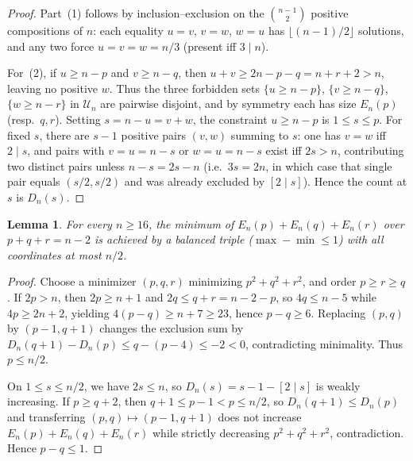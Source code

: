 \documentclass[11pt]{article}
\newtheorem{lemma}[theorem]{Lemma}
\begin{document}
\begin{proof}
Part~(1) follows by inclusion--exclusion on the $\binom{n-1}{2}$ positive compositions of $n$: each equality $u = v$, $v = w$, $w = u$ has $\lfloor (n-1)/2 \rfloor$ solutions, and any two force $u = v = w = n/3$ (present iff $3 \mid n$).

For~(2), if $u \ge n - p$ and $v \ge n - q$, then $u + v \ge 2n - p - q = n + r + 2 > n$, leaving no positive $w$. Thus the three forbidden sets $\{u \ge n - p\}$, $\{v \ge n - q\}$, $\{w \ge n - r\}$ in $\mathcal{U}_n$ are pairwise disjoint, and by symmetry each has size $E_n(p)$ (resp.\ $q, r$). Setting $s = n - u = v + w$, the constraint $u \ge n - p$ is $1 \le s \le p$. For fixed $s$, there are $s - 1$ positive pairs $(v, w)$ summing to $s$: one has $v = w$ iff $2 \mid s$, and pairs with $v = u = n - s$ or $w = u = n - s$ exist iff $2s > n$, contributing two distinct pairs unless $n - s = 2s - n$ (i.e.\ $3s = 2n$, in which case that single pair equals $(s/2, s/2)$ and was already excluded by $[2 \mid s]$). Hence the count at $s$ is $D_n(s)$.
\end{proof}

\begin{lemma}\label{lem:balance}
For every $n \ge 16$, the minimum of $E_n(p) + E_n(q) + E_n(r)$ over $p + q + r = n - 2$ is achieved by a balanced triple ($\max - \min \le 1$) with all coordinates at most $n/2$.
\end{lemma}

\begin{proof}
Choose a minimizer $(p, q, r)$ minimizing $p^2 + q^2 + r^2$, and order $p \ge r \ge q$. If $2p > n$, then $2p \ge n + 1$ and $2q \le q + r = n - 2 - p$, so $4q \le n - 5$ while $4p \ge 2n + 2$, yielding $4(p - q) \ge n + 7 \ge 23$, hence $p - q \ge 6$. Replacing $(p, q)$ by $(p - 1, q + 1)$ changes the exclusion sum by $D_n(q + 1) - D_n(p) \le q - (p - 4) \le -2 < 0$, contradicting minimality. Thus $p \le n/2$.

On $1 \le s \le n/2$, we have $2s \le n$, so $D_n(s) = s - 1 - [2 \mid s]$ is weakly increasing. If $p \ge q + 2$, then $q + 1 \le p - 1 < p \le n/2$, so $D_n(q + 1) \le D_n(p)$ and transferring $(p, q) \mapsto (p - 1, q + 1)$ does not increase $E_n(p) + E_n(q) + E_n(r)$ while strictly decreasing $p^2 + q^2 + r^2$, contradiction. Hence $p - q \le 1$.
\end{proof}
\end{document}
